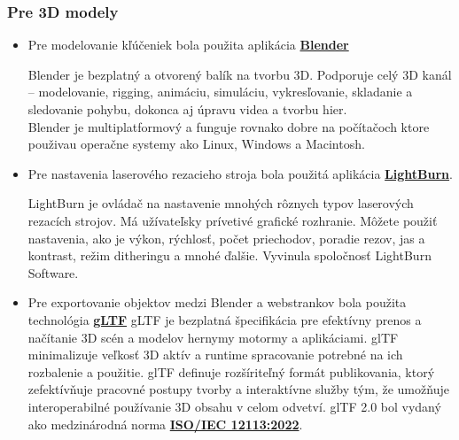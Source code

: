       \subsubsection{Pre 3D modely}
        \begin{itemize}
          \item{
            Pre modelovanie kľúčeniek bola použita aplikácia \textbf{\href{https://www.blender.org/}{Blender}} 
            
            Blender je bezplatný a otvorený balík na tvorbu 3D. Podporuje celý 3D kanál – modelovanie, rigging, animáciu, simuláciu, vykresľovanie, skladanie a sledovanie pohybu, dokonca aj úpravu videa a tvorbu hier. \\
            Blender je multiplatformový a funguje rovnako dobre na počítačoch ktore použivau operačne systemy ako Linux, Windows a Macintosh.
          }
          \item{
              Pre nastavenia laserového rezacieho stroja bola použitá aplikácia \textbf{\href{https://lightburnsoftware.com/}{LightBurn}}.

              LightBurn je ovládač na nastavenie mnohých rôznych typov laserových rezacích strojov. Má užívateľsky prívetivé grafické rozhranie. Môžete použiť nastavenia, ako je výkon, rýchlosť, počet priechodov, poradie rezov, jas a kontrast, režim ditheringu a mnohé ďalšie. Vyvinula spoločnosť LightBurn Software.
          }
          \item{
            Pre exportovanie objektov medzi Blender a webstrankov bola použita technológia \textbf{\href{https://www.khronos.org/gltf/}{gLTF}}
            gLTF je bezplatná špecifikácia pre efektívny prenos a načítanie 3D scén a modelov hernymy motormy a aplikáciami. glTF minimalizuje veľkosť 3D aktív a runtime spracovanie potrebné na ich rozbalenie a použitie. glTF definuje rozšíriteľný formát publikovania, ktorý zefektívňuje pracovné postupy tvorby a interaktívne služby tým, že umožňuje interoperabilné používanie 3D obsahu v celom odvetví. glTF 2.0 bol vydaný ako medzinárodná norma \textbf{\href{https://www.iso.org/standard/83990.html}{ISO/IEC 12113:2022}}.
          }
        \end{itemize}


